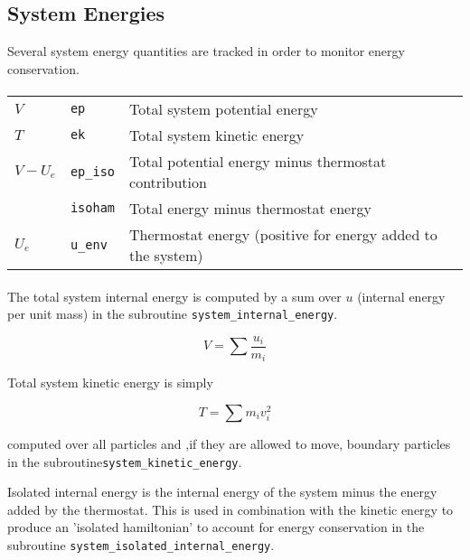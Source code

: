 \subsection{System Energies}
Several system energy quantities are tracked in order to monitor energy conservation.

\paragraph{}
\begin{tabularx}{\textwidth}{lll} \toprule
$V$& \texttt{ep} & Total system potential energy\\
$T$& \texttt{ek} & Total system kinetic energy\\
$V-U_{e}$& \texttt{ep\_iso} & Total potential energy minus thermostat contribution\\
$ $& \texttt{isoham} & Total energy minus thermostat energy\\
$U_{e}$ & \texttt{u\_env} & Thermostat energy (positive for energy added to the system)\\
\end{tabularx}

\paragraph{}
The total system internal energy is computed by a sum over $u$ (internal energy
per unit mass) in the subroutine \texttt{system\_internal\_energy}.

\begin{equation}
V = \sum \frac{u_{i}}{m_{i}}
\label{system_internal_energy}
\end{equation}

Total system kinetic energy is simply

\begin{equation}
T = \sum  m_{i} v_{i}^{2}
\label{system_kinetic_energy}
\end{equation}

computed over all particles and ,if they are allowed to move, boundary
particles in the  subroutine\texttt{system\_kinetic\_energy}.

Isolated internal energy is the internal energy of the system minus the energy
added by the thermostat. This is used in combination with the kinetic energy to
produce an 'isolated hamiltonian' to account for energy conservation in the
subroutine \texttt{system\_isolated\_internal\_energy}.

